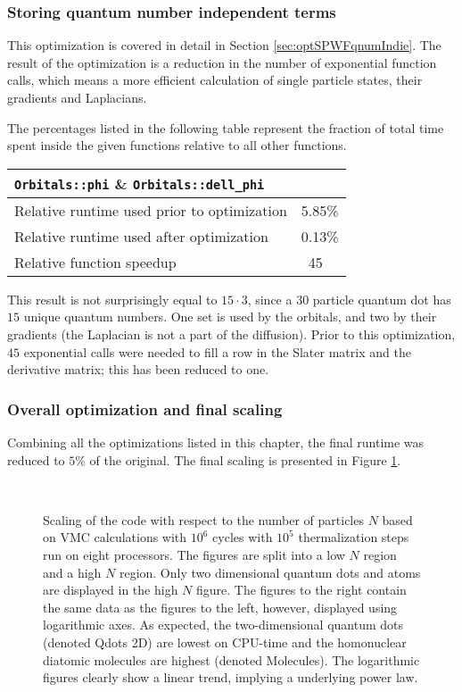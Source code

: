 \subsubsection{Storing quantum number independent terms}

This optimization is covered in detail in Section \ref{sec:optSPWFqnumIndie}. The result of the optimization is a reduction in the number of exponential function calls, which means a more efficient calculation of single particle states, their gradients and Laplacians.

The percentages listed in the following table represent the fraction of total time spent inside the given functions relative to all other functions. 

\begin{tabular}{ll}
 \verb+Orbitals::phi+ \& \verb+Orbitals::dell_phi+ & \\
 \hline\hline
 Relative runtime used prior to optimization & 5.85\% \\
 Relative runtime used after optimization    & 0.13\% \\
 \hline
 Relative function speedup                   & ~45
\end{tabular}

This result is not surprisingly equal to $15\cdot 3$, since a $30$ particle quantum dot has $15$ unique quantum numbers. One set is used by the orbitals, and two by their gradients (the Laplacian is not a part of the diffusion). Prior to this optimization, $45$ exponential calls were needed to fill a row in the Slater matrix and the derivative matrix; this has been reduced to one.

\subsubsection{Overall optimization and final scaling}

Combining all the optimizations listed in this chapter, the final runtime was reduced to $5\%$ of the original. The final scaling is presented in Figure \ref{fig:scaling}.

\begin{figure}[h]
 \begin{center}
   \\
  \caption{Scaling of the code with respect to the number of particles $N$ based on VMC calculations with $10^6$ cycles with $10^5$ thermalization steps run on eight processors. The figures are split into a low $N$ region and a high $N$ region. Only two dimensional quantum dots and atoms are displayed in the high $N$ figure. The figures to the right contain the same data as the figures to the left, however, displayed using logarithmic axes. As expected, the two-dimensional quantum dots (denoted Qdots 2D) are lowest on CPU-time and the homonuclear diatomic molecules are highest (denoted Molecules). The logarithmic figures clearly show a linear trend, implying a underlying power law.}
  \label{fig:scaling}
 \end{center}
\end{figure}

